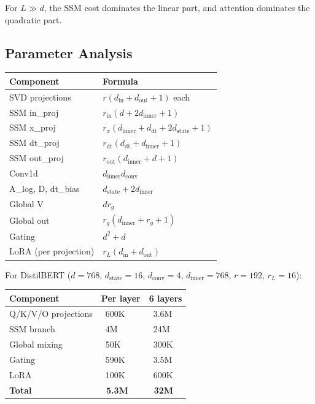 For $L \gg d$, the SSM cost dominates the linear part, and attention 
dominates the quadratic part.

\subsection{Parameter Analysis}

\begin{table}[H]
\centering
\small
\begin{tabular}{ll}
\toprule
\textbf{Component} & \textbf{Formula} \\
\midrule
SVD projections & $r(d_\text{in} + d_\text{out} + 1)$ each \\
SSM in\_proj & $r_\text{in}(d + 2 d_\text{inner} + 1)$ \\
SSM x\_proj & $r_x(d_\text{inner} + d_\text{dt} + 2 d_\text{state} + 1)$ \\
SSM dt\_proj & $r_\text{dt}(d_\text{dt} + d_\text{inner} + 1)$ \\
SSM out\_proj & $r_\text{out}(d_\text{inner} + d + 1)$ \\
Conv1d & $d_\text{inner} d_\text{conv}$ \\
A\_log, D, dt\_bias & $d_\text{state} + 2 d_\text{inner}$ \\
Global V & $d r_g$ \\
Global out & $r_g(d_\text{inner} + r_g + 1)$ \\
Gating & $d^2 + d$ \\
LoRA (per projection) & $r_L(d_\text{in} + d_\text{out})$ \\
\bottomrule
\end{tabular}
\end{table}

For DistilBERT ($d = 768$, $d_\text{state} = 16$, $d_\text{conv} = 4$, 
$d_\text{inner} = 768$, $r = 192$, $r_L = 16$):

\begin{table}[H]
\centering
\small
\begin{tabular}{lll}
\toprule
\textbf{Component} & \textbf{Per layer} & \textbf{6 layers} \\
\midrule
Q/K/V/O projections & ~600K & ~3.6M \\
SSM branch & ~4M & ~24M \\
Global mixing & ~50K & ~300K \\
Gating & ~590K & ~3.5M \\
LoRA & ~100K & ~600K \\
\textbf{Total} & \textbf{~5.3M} & \textbf{~32M} \\
\bottomrule
\end{tabular}
\end{table}


